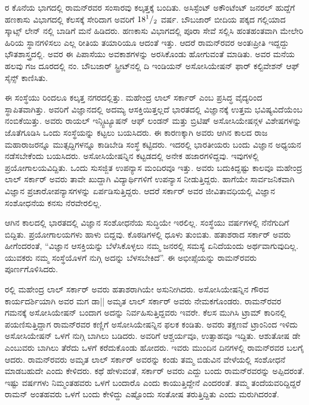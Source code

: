ರ ಕೊನೆಯ ಭಾಗದಲ್ಲಿ ರಾಮನ್‍ರವರ ಸಂಸಾರವು ಕಲ್ಕತ್ತಕ್ಕೆ ಬಂದಿತು. ಅಸಿಸ್ಟೆಂಟ್ ಅಕೌಂಟೆಂಟ್ ಜನರಲ್ ಹುದ್ದೆಗೆ ಹಣಕಾಸು ವಿಭಾಗದಲ್ಲಿ ಕೆಲಸಕ್ಕೆ ಸೇರಿದಾಗ ಅವರಿಗೆ ${\rm 18}^1/_2$ ವರ್ಷ. ಬೌಬಜಾರ್ ಬೀದಿಯ ಪಕ್ಕದ ಗಲ್ಲಿಯಾದ ಸ್ಕಾಟ್ಸ್ ‍ಲೇನ್ ನಲ್ಲಿ ಬಾಡಿಗೆ ಮನೆ ಹಿಡಿದರು. ಹಣಕಾಸು ವಿಭಾಗದಲ್ಲಿ ಪೂರಾ ಸೇವೆ ಸಲ್ಲಿಸಿ ಹಂತಹಂತವಾಗಿ ಮೇಲೇರಿ ಹಿರಿಯ ಸ್ಥಾನಗಳಿಸಲು ಎಲ್ಲ ರೀತಿಯ ತಯಾರಿಯೂ ಆದಂತೆ ಇತ್ತು. ಆದರೆ ರಾಮನ್‍ರವರ ಅಂತಃಪ್ರೀತಿ ಇದ್ದದ್ದು ಭೌತಶಾಸ್ತ್ರದಲ್ಲಿ. ಅವರ ಈ ಪಿಪಾಸೆಯು ಅವಕಾಶಗಳನ್ನು ಅರಸಿಕೊಂಡು ಹೋಗುವಂತೆ ಮಾಡಿತು. ಅವರ ಮನೆಯ ಹಲವು ಗಜ ದೂರದಲ್ಲಿ ನಂ. ಬೌಬಜಾರ್ ಸ್ಟ್ರೀಟ್‍ನಲ್ಲಿ ದಿ ಇಂಡಿಯನ್ ಅಸೋಸಿಯೇಷನ್ ಫಾರ್ ಕಲ್ಟಿವೇಶನ್ ಆಫ್ ಸೈನ್ಸ್ ಕಾಣಿಸಿತು.



ಈ ಸಂಸ್ಥೆಯು  ರಿಂದಲೂ ಕಲ್ಕತ್ತ ನಗರದಲ್ಲಿತ್ತು. ಮಹೇಂದ್ರ ಲಾಲ್ ಸರ್ಕಾರ್ ಎಂಬ ಪ್ರಸಿದ್ಧ ವೈದ್ಯರಿಂದ ಸ್ಥಾಪಿತವಾಗಿತ್ತು. ಅವರಿಗೆ ವಿಜ್ಞಾನದಲ್ಲಿ ಅದಮ್ಯ ಆಸಕ್ತಿಯಿತ್ತಲ್ಲದೆ ಭಾರತದಲ್ಲಿ ವಿಜ್ಞಾನಕ್ಕೆ ಉತ್ತಮ ಭವಿಷ್ಯವಿದೆಯೆಂಬ ನಂಬಿಕೆಯಿತ್ತು. ಅವರು ರಾಯಲ್ ಇನ್ಸ್ಟಿಟ್ಯೂಷನ್ ಆಫ್ ಲಂಡನ್ ಮತ್ತು ಬ್ರಿಟಿಷ್ ಅಸೋಸಿಯೇಷನ್ಗಳ ವಿಶೇಷಗಳನ್ನು ಜೊತೆಗೂಡಿಸಿ ಒಂದು ಸಂಸ್ಥೆಯನ್ನು ಕಟ್ಟಲು ಬಯಸಿದರು. ಈ ಕಾರಣಕ್ಕಾಗಿ ಅವರು ಆಗಿನ ಕಾಲದ ರಾಜ ಮಹಾರಾಜರನ್ನೂ ಮುತ್ಸದ್ದಿಗಳನ್ನೂ ಕಾಡಿಬೇಡಿ ಸಂಸ್ಥೆ ಕಟ್ಟಿದರು. ಇದರಲ್ಲಿ ಭಾರತೀಯರು ಬಂದು ವಿಜ್ಞಾನ ಅಧ್ಯಯನ ನಡೆಸಬೇಕೆಂದು ಬಯಸಿದರು. ಅಸೋಸಿಯೇಷನ್ನಿನ ಕಟ್ಟಡದಲ್ಲಿ ಅನೇಕ ಹಜಾರಗಳಿದ್ದವು. ಇವುಗಳಲ್ಲಿ ಪ್ರಯೋಗಾಲಯವಿದ್ದಿತು. ಒಂದು ಸುಸಜ್ಜಿತ ಉಪನ್ಯಾಸ ಮಂದಿರವೂ ಇತ್ತು. ಅವರು ಬದುಕಿದ್ದಷ್ಟು ಕಾಲವೂ ಮಹೇಂದ್ರ ಲಾಲ್ ಸರ್ಕಾರ್ ಅವರು ತಾವೇ ಖುದ್ದಾಗಿ ವಿದ್ಯಾರ್ಥಿಗಳಿಗೆ ಉಪನ್ಯಾಸ ನೀಡುತ್ತಿದ್ದರು. ಹಾಗೆಯೇ ಸಾರ್ವಜನಿಕವಾಗಿ ವಿಜ್ಞಾನ ಪ್ರಚಾರೋಪನ್ಯಾಸಗಳನ್ನು ಏರ್ಪಡಿಸುತ್ತಿದ್ದರು. ಆದರೆ ಸರ್ಕಾರ್ ಅವರ ಜೀವಿತಾವಧಿಯಲ್ಲಿ ವಿಜ್ಞಾನ ಸಂಶೋಧನೆಯ ಕನಸು ನೆರವೇರಲಿಲ್ಲ.

ಆಗಿನ ಕಾಲದಲ್ಲಿ ಭಾರತದಲ್ಲಿ ವಿಜ್ಞಾನ ಸಂಶೋಧನೆಯ ಸುದ್ಧಿಯೇ ಇರಲಿಲ್ಲ. ಸಂಸ್ಥೆಯು  ವರ್ಷಗಳಲ್ಲಿ ನೆನೆಗುದಿಗೆ ಬಿದ್ದಿತು. ಪ್ರಯೋಗಾಲಯಗಳು ಹಾಳು ಬಿದ್ದವು. ಕೊಠಡಿಗಳಲ್ಲಿ ಧೂಳು ತುಂಬಿತು. ಹತಾಶರಾದ ಸರ್ಕಾರ್ ಅವರು ಹೀಗೆಂದರಂತೆ, “ವಿಜ್ಞಾನ ಆಸಕ್ತಿಯನ್ನು ಬೆಳೆಸಿಕೊಳ್ಳಲು ನಮ್ಮ ಜನರಲ್ಲಿ ಸಮಸ್ಯೆ ಏನಿದೆಯಂದು ಅರ್ಥವಾಗುವುದಿಲ್ಲ. ಯುವಕರು ನಮ್ಮ ಸಂಸ್ಥೆಯೊಳಗೆ ನುಗ್ಗಿ ಅದನ್ನು ಬೆಳಸಬೇಕಿದೆ”. ಈ ಅಭೀಪ್ಸೆಯನ್ನು ರಾಮನ್‍ರವರು ಪೂರ್ಣಗೊಳಿಸಿದರು.

ರಲ್ಲಿ ಮಹೇಂದ್ರ ಲಾಲ್ ಸರ್ಕಾರ್ ಅವರು ಹತಾಶರಾಗಿಯೇ ಅಸುನೀಗಿದರು. ಅಸೋಸಿಯೇಷನ್ನಿನ ಗೌರವ ಕಾರ್ಯದರ್ಶಿಯಾಗಿ ಅವರ ಮಗ ಡಾ|| ಅಮೃತ ಲಾಲ್ ಸರ್ಕಾರ್ ಅವರು ನೇಮಕಗೊಂಡರು. ರಾಮನ್‍ರವರ ಗಮನಕ್ಕೆ ಅಸೋಸಿಯೇಷನ್ ಬಂದಾಗ ಅದನ್ನು ನಿರ್ವಹಿಸುತ್ತಿದ್ದವರು ಇವರೇ. ಕೆಲಸ ಮುಗಿಸಿ ಟ್ರಾಮ್ ಕಾರಿನಲ್ಲಿ ಪಯಣಿಸುತ್ತಿದ್ದಾಗ ರಾಮನ್‍ರವರ ಕಣ್ಣಿಗೆ ಅಸೋಸಿಯೇಷನ್ನಿನ ಫಲಕ ಕಂಡಿತು. ಅವರು ತಕ್ಷಣವೆ ಟ್ರಾಂನಿಂದ ಇಳಿದು ಅಸೋಸಿಯೇಷನ್ ಒಳಗೆ ನುಗ್ಗಿ ಬಾಗಿಲು ಬಡಿದರು. ಅವರಿಗೆ ಆಶ್ಚರ್ಯವೂ, ಉತ್ಸಾಹವೂ ಇದ್ದಿತು. ಆಶುತೋಷ ಡೇ ಎಂಬುವರು ಬಾಗಿಲು ತೆರೆದು ಒಳಗೆ ಕರೆದುಕೊಂಡು ಹೋದರು. ಇವರು ಮುಂದಿನ ದಿನಗಳಲ್ಲಿ ರಾಮನ್‍ರವರ ಬಲಗೈ ಆದರು. ರಾಮನ್‍ರವರು ಅಮೃತ ಲಾಲ್ ಸರ್ಕಾರ್ ಅವರನ್ನು ಕಂಡು ತಮ್ಮ ಬಿಡುವಿನ ವೇಳೆಯಲ್ಲಿ ಸಂಶೋಧನೆ ಮಾಡಬಹುದೇ ಎಂದು ಕೇಳಿದರು. ಕಥೆ ಹೇಳುವಂತೆ, ಸರ್ಕಾರ್ ಅವರು ಎದ್ದು ಬಂದು ರಾಮನ್‍ರವರನ್ನು ಅಪ್ಪಿದರಂತೆ. ಇಷ್ಟು ವರ್ಷಗಳು ನಿಮ್ಮಂತಹವರು ಒಳಗೆ ಬಂದಾರೊ ಎಂದು ಕಾಯುತ್ತಿದ್ದೇನೆ ಎಂದರಂತೆ. ತಮ್ಮ ತಂದೆಯವರಿದ್ದಿದ್ದರೆ ರಾಮನ್ ಅಂತಹವರು ಒಳಗೆ ಬಂದು ಕೇಳಿದ್ದು ಎಷ್ಟೊಂದು ಸಂತೋಷ ತರುತ್ತಿದ್ದಿತು ಎಂದು ಮರುಗಿದರಂತೆ.

